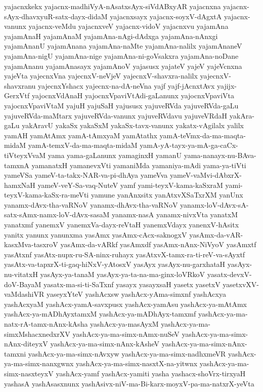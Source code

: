 {yajacnxkekx
yajacnx-madhiVyA-nAsatxsAyx-siVdABxyAR
yajacnxna
yajacnx-sAyx-dhavxyuR-satx-dayx-didaM
yajacnxsayx
yajacnx-soyxV-dAgxtA
yajacnx-vanunx
yajacnx-veMdu
yajacnxveV
yajacnx-vidoV
yajacnxvu
yajamAna
yajamAnaH
yajamAnaM
yajamAna-nAgi-dAdxga
yajamAna-nAnxgi
yajamAnanU
yajamAnana
yajamAna-naMte
yajamAna-nalilx
yajamAnaneV
yajamAna-nigU
yajamAna-nige
yajamAna-ni-goVsakxra
yajamAna-noDane
yajamAnanu
yajamAnasayx
yajamAnoV
yajasusx
yajateV
yajeV
yajeVcnxna
yajeVta
yajecnxVna
yajecnxV-neVjeV
yajecnxV-shavxra-nalilx
yajecnxV-shavxranu
yajecnxYshacx
yajecnx-na-dA-neVna
yajf
yajf-jAcnxtAvx
yajijx-GerxVtf
yajocnxVdAnaH
yajocnxVpaviVtAdi-gaLanunx
yajocnxVpaviVta
yajocnxVpaviVtaM
yajuH
yajuSaH
yajususx
yajuveRVda
yajuveRVda-gaLu
yajuveRVda-maMtarx
yajuveRVda-vanunx
yajuveRVdavu
yajuveVRdaH
yakAra-gaLu
yakAravU
yakaSx
yakaSxM
yakaSx-tavx-vanunx
yakatx-vAgilalx
yalilx
yamAH
yamAtAmx
yamA-tAmxyaM
yamAtathx
yamA-teVmx-da-ma-maqta-midaM
yamA-temxV-da-ma-maqta-midaM
yamA-yA-tayx-ya-mA-ga-caCx-tiVteyxVvaM
yama
yama-gaLanunx
yamaginxH
yamanU
yama-nanayx-nu-BAva-tamxnA
yamanatxH
yamanevxVti
yamaniMda
yamaniya-mAdi
yama-ya-tiVti
yameVSa
yameV-ta-takx-NAR-va-pi-dhAya
yameVva
yameV-vaMvi-dAbxrX-hamxNaH
yameV-veY-Sa-vaq-NuteV
yamf
yami-teyxV-kama-kaSxraM
yami-teyxV-kama-kaSx-ra-meVti
yamune
yanAnxsitx
yanAtxvXSaTxrXM
yanUnx
yanamx-dAvx-tha-vaRNoV
yanamx-dhAvx-tha-vaRNoV
yanamx-loV-dAvx-sA-satx-sAmx-namx-loV-dAvx-sasaM
yanamx-nasA
yanamx-nivxVta
yanatxM
yanatxmf
yanemxV
yanemxVa-dayx-reVtaH
yanemxVdayx
yanenxV-hAsitx
yanitx
yanunx
yanunxma
yasAmx
yasAmx-cAcx-saknogxV
yasAmx-da-vAR-kasxMva-tasxroV
yasAmx-da-vARkf
yasAmxdf
yasAmx-nAnx-NiVyoV
yasAmxtf
yasAtxnf
yasAtx-nupx-ru-SA-ninx-ruhayx
yasAtxvX-tamx-ra-ti-reV-va-sAyxtf
yasAtx-va-tapxrX-ti-gaq-hiNxV-yAtosxV
yasAyx
yasAyx-nu-garxhataH
yasAyx-nu-vitatxH
yasAyx-ya-tanaM
yasAyx-ya-ta-na-ma-ginx-loVRkoV
yasatx-devxV-doV-BayaM
yasatx-ma-si-ti-SaTxnf
yasayx
yasayxsaH
yasetx
yasetxV
yasetxvXV-vaMdashiVR
yaseyxYteV
yashAcxsw
yashAcx-yAma-simxnf
yashAcxya
yashAcxyaM
yashAcx-yamA-savxpusx
yashAcx-yamAsu
yashAcx-ya-mAtAmx
yashAcx-ya-mADhAyxtamxM
yashAcx-ya-mADhAyx-tamxmf
yashAcx-ya-ma-natx-rA-tamx-nAnx-kAsha
yashAcx-ya-masAyxM
yashAcx-ya-ma-simxMshacxnedxrXV
yashAcx-ya-ma-simx-nAmx-nuSeV
yashAcx-ya-ma-simx-nAnx-diteyxV
yashAcx-ya-ma-simx-nAnx-kAsheV
yashAcx-ya-ma-simx-nAnx-tamxni
yashAcx-ya-ma-simx-nAvxyw
yashAcx-ya-ma-simx-nadhxmeVR
yashAcx-ya-ma-simx-nanxgwnx
yashAcx-ya-ma-simx-nasxtX-na-yitwnx
yashAcx-ya-ma-simx-nasxteyxV
yashAcx-yamf
yashAcx-yamiti
yasha
yashacx-shoVrx-tirxyaH
yashasA
yashAsasxnunx
yashAsivx-niV-ma-Bi-karx-moyxV-pa-ma-natxrX-yeVta
}
